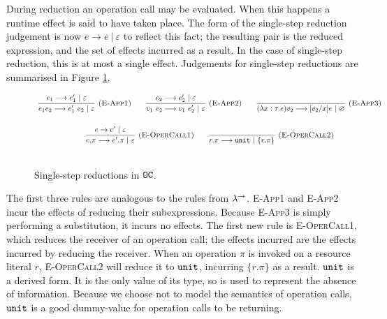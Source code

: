 During reduction an operation call may be evaluated. When this happens a runtime effect is said to have taken place. The form of the single-step reduction judgement is now $e \longrightarrow e~|~\varepsilon$ to reflect this fact; the resulting pair is the reduced expression, and the set of effects incurred as a result. In the case of single-step reduction, this is at most a single effect. Judgements for single-step reductions are summarised in Figure \ref{fig:opercalc_singlestep}.

\begin{figure}[h]

\noindent
{}

\[
\begin{array}{c}

\infer[\textsc{(E-App1)}]
	{e_1 e_2 \longrightarrow e_1'~ e_2~|~\varepsilon}
	{e_1 \longrightarrow e_1'~|~\varepsilon}
	~~~~~~
\infer[\textsc{(E-App2)}]
	{v_1 ~ e_2 \longrightarrow v_1 ~ e_2'~|~\varepsilon} 
	{e_2 \longrightarrow e_2'~|~\varepsilon}
~~~~~~
\infer[\textsc{(E-App3)}]
	{ (\lambda x: \tau. e) v_2 \longrightarrow [ v_2/x] e~|~\varnothing }
	{}\\[4ex]
	
\infer[\textsc{(E-OperCall1)}]
	{ e.\pi \longrightarrow  e'.\pi~|~\varepsilon }
	{ e \rightarrow  e'~|~\varepsilon}
		
	~~~~~~
	
\infer[\textsc{(E-OperCall2)}]
	{r.\pi \longrightarrow \kwa{unit}~|~\{ r.\pi \} }
	{}
	 \\[4ex]
	 
\end{array}
\]


\vspace{-7pt}
\caption{Single-step reductions in $\mathtt{OC}$.}
\label{fig:opercalc_singlestep}
\end{figure}

The first three rules are analogous to the rules from $\lambda^{\rightarrow}$. \textsc{E-App1} and \textsc{E-App2} incur the effects of reducing their subexpressions. Because \textsc{E-App3} is simply performing a substitution, it incurs no effects. The first new rule is \textsc{E-OperCall1}, which reduces the receiver of an operation call; the effects incurred are the effects incurred by reducing the receiver. When an operation $\pi$ is invoked on a resource literal $r$, \textsc{E-OperCall2} will reduce it to $\mathtt{unit}$, incurring $\{ r.\pi \}$ as a result. $\mathtt{unit}$ is a derived form. It is the only value of its type, so is used to represent the absence of information. Because we choose not to model the semantics of operation calls, $\mathtt{unit}$ is a good dummy-value for operation calls to be returning.

